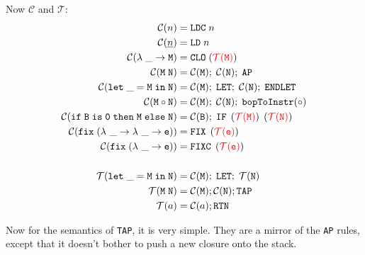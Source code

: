 Now $\mathcal{C}$ and $\mathcal{T}$:
\[
\begin{aligned}
    \mathcal{C}(n) &= \mathtt{LDC}\; n \\
    \mathcal{C}(\underline{n}) &= \mathtt{LD}\; n \\
    \mathcal{C}(\mathtt{\lambda\; \_ \to M}) &= \mathtt{CLO}\; (\textcolor{red}{\mathcal{T}(\mathtt{M})}) \\
    \mathcal{C}(\mathtt{M\; N}) &= \mathcal{C}(\mathtt{M});\; \mathcal{C}(\mathtt{N});\; \mathtt{AP} \\
    \mathcal{C}(\mathtt{let\; \_ = M\; in\; N}) & = \mathcal{C}(\mathtt{M});\; \texttt{LET};\; \mathcal{C}(\mathtt{N});\; \texttt{ENDLET} \\
    \mathcal{C}(\mathtt{M \circ N}) &= \mathcal{C}(\mathtt{M});\; \mathcal{C}(\mathtt{N});\; \mathtt{bopToInstr}(\circ) \\
    \mathcal{C}(\mathtt{if\; B\; is\; 0\; then \; M\; else \; N}) &= \mathcal{C}(\mathtt{B});\; \mathtt{IF}\; \left(\textcolor{red}{\mathcal{T}(\mathtt{M})}\right)\; \left(\textcolor{red}{\mathcal{T}(\mathtt{N})}\right) \\
    \mathcal{C}(\mathtt{fix\; (\lambda \ \_ \to \lambda \ \_ \to e)}) &= \mathtt{FIX}\; \left(\textcolor{red}{\mathcal{T}(\mathtt{e})}\right) \\
    \mathcal{C}(\mathtt{fix\; (\lambda \ \_ \to e)}) &= \mathtt{FIXC}\; \left(\textcolor{red}{\mathcal{T}(\mathtt{e})}\right) \\
    \\
    \mathcal{T}(\mathtt{let\; \_ = M\; in\; N}) & = \mathcal{C}(\mathtt{M});\; \texttt{LET};\; \mathcal{T}(\mathtt{N}) \\
    \mathcal{T}(\mathtt{M\; N}) &= \mathcal{C}(\mathtt{M}); \mathcal{C}(\mathtt{N}); \mathtt{TAP} \\
    \mathcal{T}(a) &= \mathcal{C}(a); \texttt{RTN}
\end{aligned}
\]

Now for the semantics of \texttt{TAP}, it is very simple. They are a mirror of the \texttt{AP} rules, except that it doesn't bother
to push a new closure onto the stack.

